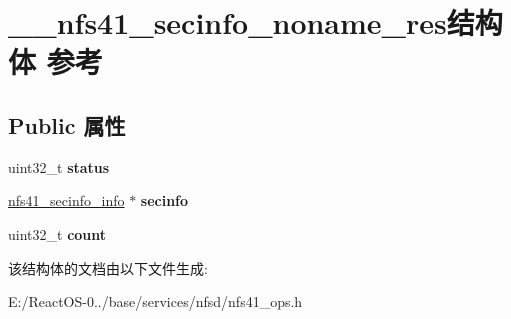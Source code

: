 \hypertarget{struct____nfs41__secinfo__noname__res}{}\section{\+\_\+\+\_\+nfs41\+\_\+secinfo\+\_\+noname\+\_\+res结构体 参考}
\label{struct____nfs41__secinfo__noname__res}
\subsection*{Public 属性}
\begin{DoxyCompactItemize}
\item 
\mbox{\label{struct____nfs41__secinfo__noname__res_a4af18b6deb4320352f6fac2ea9bc1eb2}} 
uint32\+\_\+t {\bfseries status}
\item 
\mbox{\label{struct____nfs41__secinfo__noname__res_adc62395126842b1b98a11994616fe258}} 
\hyperlink{struct____nfs41__secinfo__info}{nfs41\+\_\+secinfo\+\_\+info} $\ast$ {\bfseries secinfo}
\item 
\mbox{\label{struct____nfs41__secinfo__noname__res_a2cfbdb4a6cf232632a1387f58f5ffaae}} 
uint32\+\_\+t {\bfseries count}
\end{DoxyCompactItemize}


该结构体的文档由以下文件生成\+:\begin{DoxyCompactItemize}
\item 
E\+:/\+React\+O\+S-\/0../base/services/nfsd/nfs41\+\_\+ops.\+h\end{DoxyCompactItemize}
